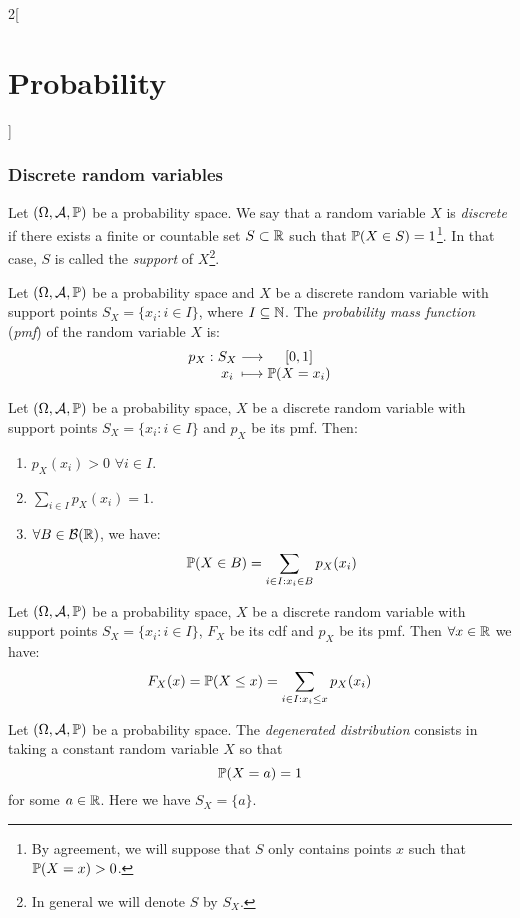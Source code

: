 \documentclass[../../../main_math.tex]{subfiles}
\begin{document}
\begin{multicols}{2}[\section{Probability}]
  \subsubsection{Discrete random  variables}
  \begin{definition}
    Let $(\Omega,\mathcal{A},\mathbb{P})$ be a probability space. We say that a random variable $X$ is \emph{discrete} if there exists a finite or countable set $S\subset\mathbb{R}$ such that $\mathbb{P}(X\in S)=1$\footnote{By agreement, we will suppose that $S$ only contains points $x$ such that $\mathbb{P}(X=x)>0$.}. In that case, $S$ is called the \emph{support} of $X$\footnote{In general we will denote $S$ by $S_X$.}.
  \end{definition}
  \begin{definition}
    Let $(\Omega,\mathcal{A},\mathbb{P})$ be a probability space and $X$ be a discrete random variable with support points $S_X=\{x_i:i\in I\}$, where $I\subseteq\mathbb{N}$. The \emph{probability mass function} (\emph{pmf}) of the random variable $X$ is:
    $$
      \function{p_X}{S_X}{[0,1]}{x_i}{\Prob(X=x_i)}
    $$
  \end{definition}
  \begin{proposition}
    Let $(\Omega,\mathcal{A},\mathbb{P})$ be a probability space, $X$ be a discrete random variable with support points $S_X=\{x_i:i\in I\}$ and $p_X$ be its pmf. Then:
    \begin{enumerate}
      \item $p_X(x_i)>0$ $\forall i\in I$.
      \item $\displaystyle\sum_{i\in I}p_X(x_i)=1$.
      \item $\forall B\in\mathcal{B}(\mathbb{R})$, we have: $$\mathbb{P}(X\in B)=\sum_{i\in I:x_i\in B}p_X(x_i)$$
    \end{enumerate}
  \end{proposition}
  \begin{corollary}
    Let $(\Omega,\mathcal{A},\mathbb{P})$ be a probability space, $X$ be a discrete random variable with support points $S_X=\{x_i:i\in I\}$, $F_X$ be its cdf and $p_X$ be its pmf. Then $\forall x\in\mathbb{R}$ we have: $$F_X(x)=\mathbb{P}(X\leq x)=\sum_{i\in I:x_i\leq x}p_X(x_i)$$
  \end{corollary}
  \begin{definition}
    Let $(\Omega,\mathcal{A},\mathbb{P})$ be a probability space. The \emph{degenerated distribution} consists in taking a constant random variable $X$ so that $$\mathbb{P}(X=a)=1$$ for some $a\in\mathbb{R}$. Here we have $S_X=\{a\}$.

\end{definition}
\end{multicols}
\end{document}

